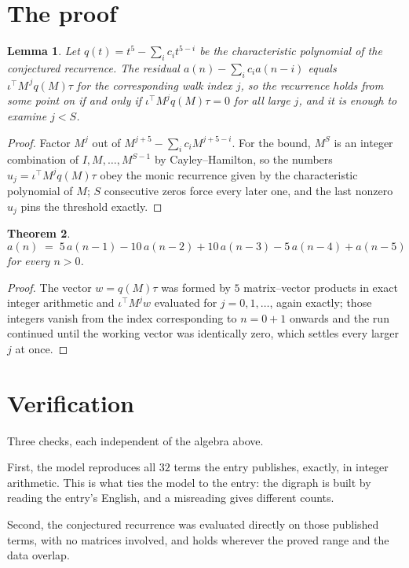 \documentclass[11pt,a4paper]{article}
\theoremstyle{plain}
\newtheorem{theorem}{Theorem}
\newtheorem{lemma}[theorem]{Lemma}
\theoremstyle{definition}
\begin{document}
\section{The proof}

\begin{lemma}\label{lem:crit}
Let $q(t)=t^{5}-\sum_i c_it^{5-i}$ be the characteristic polynomial of the
conjectured recurrence. The residual $a(n)-\sum_ic_ia(n-i)$ equals
$\iota^{\!\top}M^{\,j}q(M)\tau$ for the corresponding walk index $j$, so the recurrence
holds from some point on if and only if $\iota^{\!\top}M^{j}q(M)\tau=0$ for all large $j$,
and it is enough to examine $j<S$.
\end{lemma}

\begin{proof}
Factor $M^{j}$ out of $M^{j+5}-\sum_ic_iM^{j+5-i}$. For the bound, $M^{S}$
is an integer combination of $I,M,\dots,M^{S-1}$ by Cayley--Hamilton, so the numbers
$u_j=\iota^{\!\top}M^{j}q(M)\tau$ obey the monic recurrence given by the characteristic
polynomial of $M$; $S$ consecutive zeros force every later one, and the last nonzero $u_j$
pins the threshold exactly.
\end{proof}

\begin{theorem}
\[
a(n)\;=\;5\,a(n-1) - 10\,a(n-2) + 10\,a(n-3) - 5\,a(n-4) + a(n-5)
\]
for every $n>0$.
\end{theorem}

\begin{proof}
The vector $w=q(M)\tau$ was formed by $5$ matrix--vector products in exact integer
arithmetic and $\iota^{\!\top}M^{j}w$ evaluated for $j=0,1,\dots$, again exactly; those
integers vanish from the index corresponding to $n=0+1$ onwards and the run continued
until the working vector was identically zero, which settles every larger $j$ at once.
\end{proof}

\section{Verification}

Three checks, each independent of the algebra above.

First, the model reproduces all $32$ terms the entry publishes, exactly, in integer
arithmetic. This is what ties the model to the entry: the digraph is built by reading the
entry's English, and a misreading gives different counts.

Second, the conjectured recurrence was evaluated directly on those published terms, with no
matrices involved, and holds wherever the proved range and the data overlap.
\end{document}
